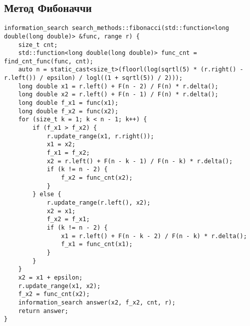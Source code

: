 \subsection {Метод Фибоначчи} 
\begin{lstlisting}
information_search search_methods::fibonacci(std::function<long double(long double)> &func, range r) {
    size_t cnt;
    std::function<long double(long double)> func_cnt = find_cnt_func(func, cnt);
    auto n = static_cast<size_t>(floorl(log(sqrtl(5) * (r.right() - r.left()) / epsilon) / logl((1 + sqrtl(5)) / 2)));
    long double x1 = r.left() + F(n - 2) / F(n) * r.delta();
    long double x2 = r.left() + F(n - 1) / F(n) * r.delta();
    long double f_x1 = func(x1);
    long double f_x2 = func(x2);
    for (size_t k = 1; k < n - 1; k++) {
        if (f_x1 > f_x2) {
            r.update_range(x1, r.right());
            x1 = x2;
            f_x1 = f_x2;
            x2 = r.left() + F(n - k - 1) / F(n - k) * r.delta();
            if (k != n - 2) {
                f_x2 = func_cnt(x2);
            }
        } else {
            r.update_range(r.left(), x2);
            x2 = x1;
            f_x2 = f_x1;
            if (k != n - 2) {
                x1 = r.left() + F(n - k - 2) / F(n - k) * r.delta();
                f_x1 = func_cnt(x1);
            }
        }
    }
    x2 = x1 + epsilon;
    r.update_range(x1, x2);
    f_x2 = func_cnt(x2);
    information_search answer(x2, f_x2, cnt, r);
    return answer;
}
\end{lstlisting}
	

\newpage
